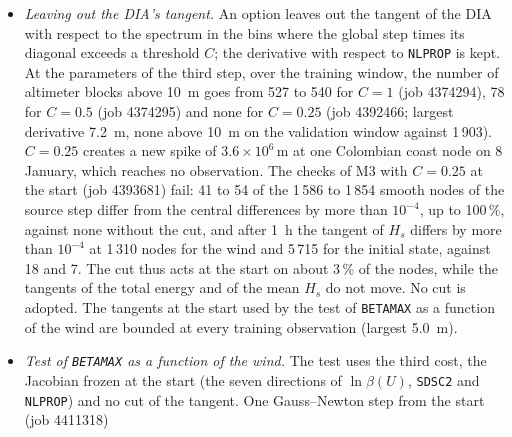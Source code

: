 \documentclass[11pt,a4paper]{article}
\begin{document}
\begin{itemize}
wind \SI{16}{m/s}, $H_s$ 3 to \SI{4}{m}). The tangent goes from
\SI{5}{m} on 4 January at 19\,h to $1.3\times10^6$\,m at 22\,h and drifts
to the Newfoundland coast by 7 January. A double-precision probe of every
part of every step (job 4388139) puts the growth in the source step,
which multiplies the tangent by 3 to 4.3 per \SI{600}{s} step on 8 of 108
steps. Central differences of the step give the same factor, 3.4 to 4.6,
where the steps $10^{-4}$ and $10^{-5}$ agree; they disagree on 67 of the
108 steps, at discrete switches of the source terms. The model itself
therefore amplifies small perturbations there, and the tangent is right.
Without the tangent of the DIA the factor is 1.2 to 1.75, without that of
the wind input 1.5 to 2.4, and without that of the dissipation 4 to 6: the
DIA's coupling of the wind-sea bins, with the wind input, beats the
damping of the dissipation.
\item \emph{Leaving out the DIA's tangent.} An option leaves out the
tangent of the DIA with respect to the spectrum in the bins where the
global step times its diagonal exceeds a threshold $C$; the derivative
with respect to \texttt{NLPROP} is kept. At the parameters of the third
step, over the training window, the number of altimeter blocks above
\SI{10}{m} goes from 527 to 540 for $C=1$ (job 4374294), 78 for
$C=0.5$ (job 4374295) and none for $C=0.25$ (job 4392466; largest
derivative \SI{7.2}{m}, none above \SI{10}{m} on the validation window
against 1\,903). $C=0.25$ creates a new spike of $3.6\times10^6$\,m at
one Colombian coast node on 8 January, which reaches no observation. The
checks of M3 with $C=0.25$ at the start (job 4393681) fail: 41 to 54 of
the 1\,586 to 1\,854 smooth nodes of the source step differ from the
central differences by more than $10^{-4}$, up to 100\,\%, against none
without the cut, and after \SI{1}{h} the tangent of $H_s$ differs by
more than $10^{-4}$ at 1\,310 nodes for the wind and 5\,715 for the
initial state, against 18 and 7. The cut thus acts at the start on about
3\,\% of the nodes, while the tangents of the total energy and of the
mean $H_s$ do not move. No cut is adopted. The tangents at the start used
by the test of \texttt{BETAMAX} as a function of the wind are bounded at
every training observation (largest \SI{5.0}{m}).
\item \emph{Test of \texttt{BETAMAX} as a function of the wind.} The
test uses the third cost, the Jacobian frozen at the start (the seven
directions of $\ln\beta(U)$, \texttt{SDSC2} and \texttt{NLPROP}) and no
cut of the tangent. One Gauss--Newton step from the start (job 4411318)

\end{itemize}
\end{document}
